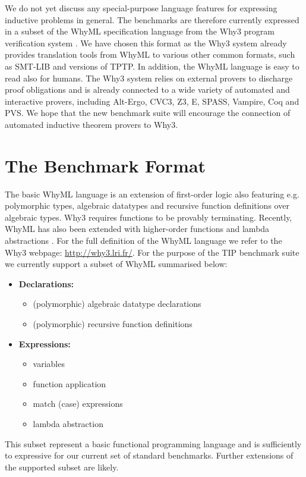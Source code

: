 \documentclass{llncs}
\begin{document}
We do not yet discuss any special-purpose language features for expressing inductive problems in general. The benchmarks are therefore currently expressed in a subset of the WhyML specification language from the Why3 program verification system \cite{boogie11why3,Why3}. We have chosen this format as the Why3 system already provides translation tools from WhyML to various other common formats, such as SMT-LIB and versions of TPTP. 
In addition, the WhyML language is easy to read also for humans. The Why3 system relies on external provers to discharge proof obligations and is already connected to a wide variety of automated and interactive provers, including  Alt-Ergo, CVC3, Z3, E, SPASS, Vampire, Coq and PVS. We hope that the new benchmark suite will encourage the connection of automated inductive theorem provers to Why3. 

\section{The Benchmark Format}
\label{sec:format}
The basic WhyML language is an extension of first-order logic also featuring e.g. polymorphic types, algebraic datatypes and recursive function definitions over algebraic types. Why3 requires functions to be provably terminating. Recently, WhyML has also been extended with higher-order functions and lambda abstractions \cite{HOWhyML}. For the full definition of the WhyML language we refer to the Why3 webpage: \url{http://why3.lri.fr/}. For the purpose of the TIP benchmark suite we currently support a subset of WhyML summarised below:
\begin{itemize}
\item \textbf{Declarations:} 
	\begin{itemize}
	\item (polymorphic) algebraic datatype declarations
	\item (polymorphic) recursive function definitions
	\end{itemize}
\item \textbf{Expressions:} 
	\begin{itemize}
	\item variables
	\item function application
	\item match (case) expressions
	\item lambda abstraction
	\end{itemize}
\end{itemize}	
This subset represent a basic functional programming language and is sufficiently to expressive for our current set of standard benchmarks. Further extensions of the supported subset are likely. 
\end{document}
